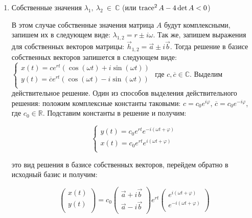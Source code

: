 \begin{enumerate}
\begin{enumerate}
	\end{enumerate}
	
	\item Собственные значения  $\lambda_1, ~ \lambda_2 ~ \in ~ \mathbb{C}$ (или $\operatorname{trace}^2 A - 4 \det A < 0$)
	
	В этом случае собственные значения матрица $A$ будут комплексными, запишем их в следующем виде:
	$\lambda_{1, 2} = r \pm i \omega$. Так же, запишем выражения для собственных векторов матрицы:
	$\vec{h}_{1, 2} = \vec{a} \pm i \vec{b}$. Тогда решение в базисе собственных векторов запишется в следующем виде:
  $\begin{cases}
  	x(t) = c e^{r t}(\cos (\omega t) + i \sin (\omega t)) \\
  	y(t) = \overline{c} e^{r t}(\cos (\omega t) - i \sin (\omega t)) \\
  \end{cases}$
  где $c, \overline{c} \in \mathbb{C}$. Выделим действительное решение. Один из способов выделения действительного решения: положим комплексные константы таковыми: $c = c_0 e^{i \varphi}$, $\overline{c} = c_0 e^{-i \varphi}$, где $c_0 \in \mathbb{R}$. Подставим константы в решение и получим:
  
  \begin{equation}
  	\begin{cases}
  		y(t) = c_0 e^{r t} e^{-i(\omega t + \varphi)} \\
  		x(t) = c_0 e^{r t} e^{i(\omega t + \varphi)} \\
  	\end{cases}
  \end{equation}
  
  это вид решения в базисе собственных векторов, перейдем обратно в исходный базис и получим:

  \begin{equation}
    \begin{pmatrix}
      x(t) \\
      y(t) \\
    \end{pmatrix} = c_0
    \begin{pmatrix}
      \vec{a} + i \vec{b} \\
      \vec{a} - i \vec{b} \\
    \end{pmatrix}
    e^{r t}
    \begin{pmatrix}
      e^{i(\omega t + \varphi)} \\
      e^{-i(\omega t + \varphi)} \\
    \end{pmatrix}
  \end{equation}


\end{enumerate}
